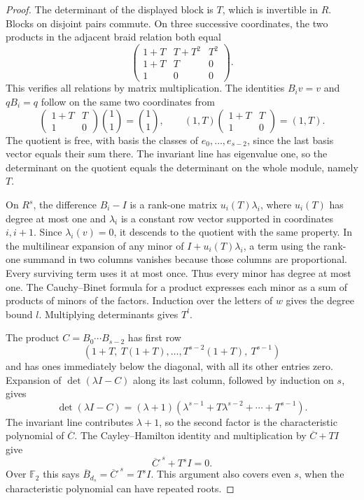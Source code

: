 \documentclass[11pt,oneside]{report}
\theoremstyle{definition}
\numberwithin{equation}{section}
\begin{document}
\begin{proof}
The determinant of the displayed block is $T$, which is invertible
in $R$. Blocks on disjoint pairs commute. On three successive
coordinates, the two products in the adjacent braid relation both
equal
\[
 \begin{pmatrix}
  1+T&T+T^2&T^2\\
  1+T&T&0\\
  1&0&0
 \end{pmatrix}.
\]
This verifies all relations by matrix multiplication.
The identities $B_iv=v$ and $qB_i=q$ follow on the same two
coordinates from
\[
 \begin{pmatrix}1+T&T\\1&0\end{pmatrix}
 \binom11=\binom11,
 \qquad
 (1,T)\begin{pmatrix}1+T&T\\1&0\end{pmatrix}=(1,T).
\]
The quotient is free, with basis the classes of
$e_0,\ldots,e_{s-2}$, since the last basis vector equals their sum
there. The invariant line has eigenvalue one, so the determinant on
the quotient equals the determinant on the whole module, namely $T$.

On $R^s$, the difference $B_i-I$ is a rank-one matrix
$u_i(T)\lambda_i$, where $u_i(T)$ has degree at most one and
$\lambda_i$ is a constant row vector supported in coordinates
$i,i+1$. Since $\lambda_i(v)=0$, it descends to the quotient with
the same property. In the multilinear expansion of any minor of
$I+u_i(T)\lambda_i$, a term using the rank-one summand in two
columns vanishes because those columns are proportional.
Every surviving term uses it at most once. Thus every minor has
degree at most one. The Cauchy--Binet formula for a product expresses
each minor as a sum of products of minors of the factors.
Induction over the letters of $w$ gives the degree bound $l$.
Multiplying determinants gives $T^l$.

The product $C=B_0\cdots B_{s-2}$ has first row
\[
 (1+T,\ T(1+T),\ldots,T^{s-2}(1+T),\ T^{s-1})
\]
and has ones immediately below the diagonal, with all its other
entries zero. Expansion of $\det(\lambda I-C)$ along its last
column, followed by induction on $s$, gives
\[
 \det(\lambda I-C)
  =(\lambda+1)
     (\lambda^{s-1}+T\lambda^{s-2}+\cdots+T^{s-1}).
\]
The invariant line contributes $\lambda+1$, so the second factor
is the characteristic polynomial of $\overline C$.
The Cayley--Hamilton identity and multiplication by
$\overline C+TI$ give
\[
 \overline C^{,s}+T^sI=0.
\]
Over $\mathbb F_2$ this says
$\overline B_{d_s}=\overline C^{,s}=T^sI$.
This argument also covers even $s$, when the characteristic
polynomial can have repeated roots.
\end{proof}
\end{document}
